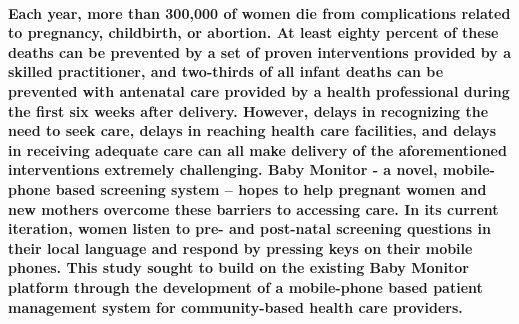\abstract

\paragraph{Each year, more than 300,000 of women die from complications related to pregnancy, childbirth, or abortion. At least eighty percent of these deaths can be prevented by a set of proven interventions provided by a skilled practitioner, and two-thirds of all infant deaths can be prevented with antenatal care provided by a health professional during the first six weeks after delivery. However, delays in recognizing the need to seek care, delays in reaching health care facilities, and delays in receiving adequate care can all make delivery of the aforementioned interventions extremely challenging. Baby Monitor -  a novel, mobile-phone based screening system – hopes to help pregnant women and new mothers overcome these barriers to accessing care. In its current iteration, women listen to pre- and post-natal screening questions in their local language and respond by pressing keys on their mobile phones. This study sought to build on the existing Baby Monitor platform through the development of a mobile-phone based patient management system for community-based health care providers.}
